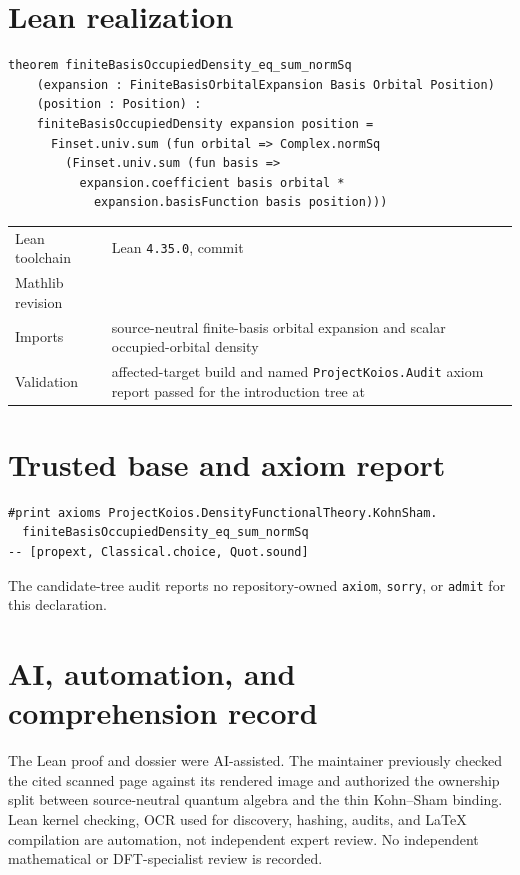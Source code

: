 \section{Lean realization}
\begin{lstlisting}
theorem finiteBasisOccupiedDensity_eq_sum_normSq
    (expansion : FiniteBasisOrbitalExpansion Basis Orbital Position)
    (position : Position) :
    finiteBasisOccupiedDensity expansion position =
      Finset.univ.sum (fun orbital => Complex.normSq
        (Finset.univ.sum (fun basis =>
          expansion.coefficient basis orbital *
            expansion.basisFunction basis position)))
\end{lstlisting}
\begin{tabularx}{\textwidth}{@{}lY@{}}
\toprule
Lean toolchain & Lean \texttt{4.35.0}, commit  \\
Mathlib revision &  \\
Imports & source-neutral finite-basis orbital expansion and scalar occupied-orbital density \\
Validation & affected-target build and named \texttt{ProjectKoios.Audit} axiom report passed for the introduction tree at  \\
\bottomrule
\end{tabularx}

\section{Trusted base and axiom report}
\begin{lstlisting}
#print axioms ProjectKoios.DensityFunctionalTheory.KohnSham.
  finiteBasisOccupiedDensity_eq_sum_normSq
-- [propext, Classical.choice, Quot.sound]
\end{lstlisting}
The candidate-tree audit reports no repository-owned \texttt{axiom}, \texttt{sorry}, or
\texttt{admit} for this declaration.

\section{AI, automation, and comprehension record}
The Lean proof and dossier were AI-assisted.  The maintainer previously checked the cited scanned
page against its rendered image and authorized the ownership split between source-neutral quantum
algebra and the thin Kohn--Sham binding.  Lean kernel checking, OCR used for discovery, hashing,
audits, and LaTeX compilation are automation, not independent expert review.  No independent
mathematical or DFT-specialist review is recorded.

